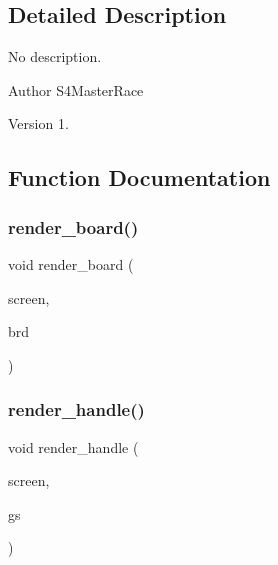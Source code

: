 \subsection{Detailed Description}
No description. 

\begin{DoxyAuthor}{Author}
S4\+Master\+Race 
\end{DoxyAuthor}
\begin{DoxyVersion}{Version}
1. 
\end{DoxyVersion}


\subsection{Function Documentation}
\mbox{\label{render_8c_ac4e08c5521b8cfdc4aacd662469e8caf}} 
\subsubsection{render\+\_\+board()}
{\footnotesize\ttfamily void render\+\_\+board (\begin{DoxyParamCaption}\item[{S\+D\+L\+\_\+\+Surface $\ast$}]{screen,  }\item[{const struct \textbf{ board} $\ast$}]{brd }\end{DoxyParamCaption})}

\mbox{\label{render_8c_ae6614230ba5be0480043779fa8d3f9a4}} 
\subsubsection{render\+\_\+handle()}
{\footnotesize\ttfamily void render\+\_\+handle (\begin{DoxyParamCaption}\item[{S\+D\+L\+\_\+\+Surface $\ast$}]{screen,  }\item[{const struct \textbf{ game\+\_\+state} $\ast$}]{gs }\end{DoxyParamCaption})}

\mbox{\label{render_8c_af45e8be6206218b6ce90c1cd10e5af05}} 
